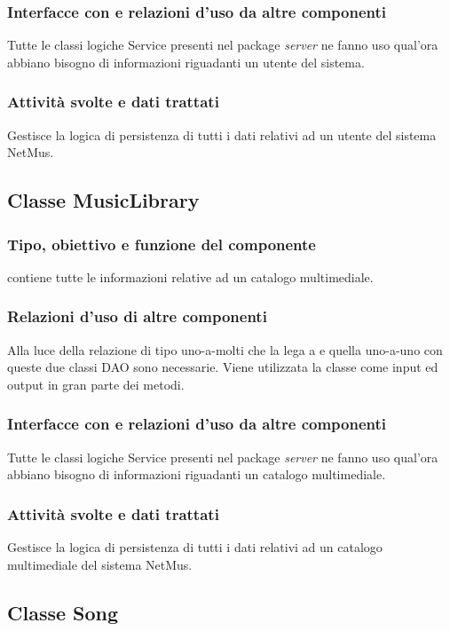 \subsubsection*{Interfacce con e relazioni d'uso da altre componenti}
Tutte le classi logiche Service presenti nel package \emph{server} ne fanno uso
qual'ora abbiano bisogno di informazioni riguadanti un utente del sistema.
\subsubsection*{Attivit\`a svolte e dati trattati}
Gestisce la logica di persistenza di tutti i dati relativi ad un utente del
sistema NetMus.

\subsection{Classe MusicLibrary}
\subsubsection*{Tipo, obiettivo e funzione del componente} 
contiene tutte le informazioni relative ad un catalogo multimediale.
\subsubsection*{Relazioni d'uso di altre componenti} Alla luce della relazione
di tipo uno-a-molti che la lega a  e quella uno-a-uno con
 queste due classi DAO sono necessarie. Viene utilizzata la
classe  come input ed output in gran parte dei metodi.
\subsubsection*{Interfacce con e relazioni d'uso da altre componenti} Tutte le
classi logiche Service presenti nel package \emph{server} ne fanno uso qual'ora
abbiano bisogno di informazioni riguadanti un catalogo multimediale.
\subsubsection*{Attivit\`a svolte e dati trattati} Gestisce la logica di
persistenza di tutti i dati relativi ad un catalogo multimediale del sistema
NetMus.

\subsection{Classe Song}
